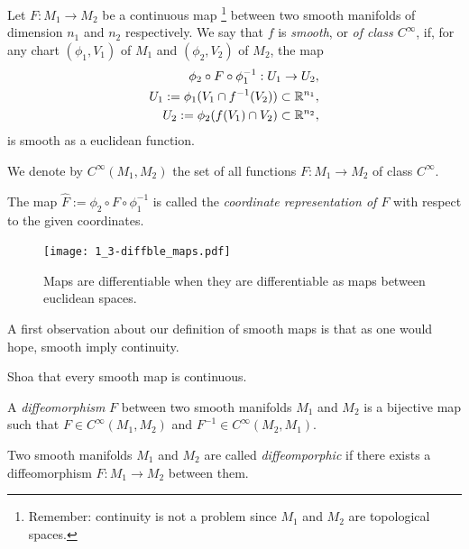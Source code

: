 \begin{definition}
  Let $F:M_1\to M_2$ be a continuous map \footnote{Remember: continuity is not a problem since $M_1$ and $M_2$ are topological spaces.} between two smooth manifolds of dimension $n_1$ and $n_2$ respectively.
  We say that $f$ is \emph{smooth}, or \emph{of class $C^\infty$}, if, for any chart $(\phi_1, V_1)$ of $M_1$ and $(\phi_2, V_2)$ of $M_2$, the map
  \begin{align}
    \phi_2 \circ F \circ \phi_1^{-1}: U_1 \to U_2,\\
    U_1 := \phi_1(V_1 \cap f^{-1}(V_2))\subset\mathbb{R}^{n_1},\\
    U_2 := \phi_2(f(V_1) \cap V_2)\subset\mathbb{R}^{n_2},
  \end{align}
  is smooth as a euclidean function.

  We denote by $C^\infty(M_1, M_2)$ the set of all functions $F:M_1\to M_2$ of class $C^\infty$.

  The map $\hat F := \phi_2 \circ F \circ \phi_1^{-1}$ is called the \emph{coordinate representation of $F$} with respect to the given coordinates.
\end{definition}

\begin{figure}[htp]
  \centering
  \texttt{[image: 1\_3-diffble\_maps.pdf]}
  \caption{Maps are differentiable when they are differentiable as maps between euclidean spaces.}
  \label{fig:1.3-differentiable_maps}
\end{figure}

A first observation about our definition of smooth maps is that as one would hope, smooth imply continuity.

\begin{exercise}
  Shoa that every smooth map is continuous.
\end{exercise}

\begin{definition}
A \emph{diffeomorphism} $F$ between two smooth manifolds $M_1$ and $M_2$ is a bijective map such that $F\in C^\infty(M_1, M_2)$ and $F^{-1}\in C^\infty(M_2, M_1)$.

Two smooth manifolds $M_1$ and $M_2$ are called \emph{diffeomporphic} if there exists a diffeomorphism $F:M_1\to M_2$ between them.
\end{definition}

